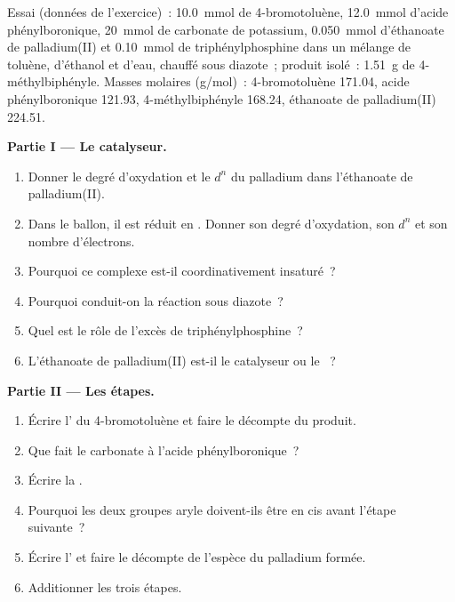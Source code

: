 \begin{problem}
\label{pb:b2:catalytic-cycles:1}
Essai (données de l'exercice)~: \qty{10.0}{mmol} de 4-bromotoluène, \qty{12.0}{mmol}
d'acide phénylboronique, \qty{20}{mmol} de carbonate de potassium, \qty{0.050}{mmol} d'éthanoate de
palladium(II) et \qty{0.10}{mmol} de triphénylphosphine dans un mélange de toluène, d'éthanol et
d'eau, chauffé sous diazote~; produit isolé~: \qty{1.51}{g} de 4-méthylbiphényle. Masses
molaires (\unit{g/mol})~: 4-bromotoluène 171.04, acide phénylboronique 121.93, 4-méthylbiphényle
168.24, éthanoate de palladium(II) 224.51.

\medskip
\noindent\textbf{Partie I --- Le catalyseur.}
\begin{enumerate}
  \item Donner le degré d'oxydation et le $d^n$ du palladium dans l'éthanoate de palladium(II).
  \item Dans le ballon, il est réduit en . Donner son degré d'oxydation, son $d^n$ et
        son nombre d'électrons.
  \item Pourquoi ce complexe est-il coordinativement insaturé~?
  \item Pourquoi conduit-on la réaction sous diazote~?
  \item Quel est le rôle de l'excès de triphénylphosphine~?
  \item L'éthanoate de palladium(II) est-il le catalyseur ou le ~?
\end{enumerate}

\medskip
\noindent\textbf{Partie II --- Les étapes.}
\begin{enumerate}[resume]
  \item Écrire l' du 4-bromotoluène et faire le décompte du produit.
  \item Que fait le carbonate à l'acide phénylboronique~?
  \item Écrire la .
  \item Pourquoi les deux groupes aryle doivent-ils être en cis avant l'étape suivante~?
  \item Écrire l' et faire le décompte de l'espèce du palladium formée.
  \item Additionner les trois étapes.
\end{enumerate}


\end{problem}
